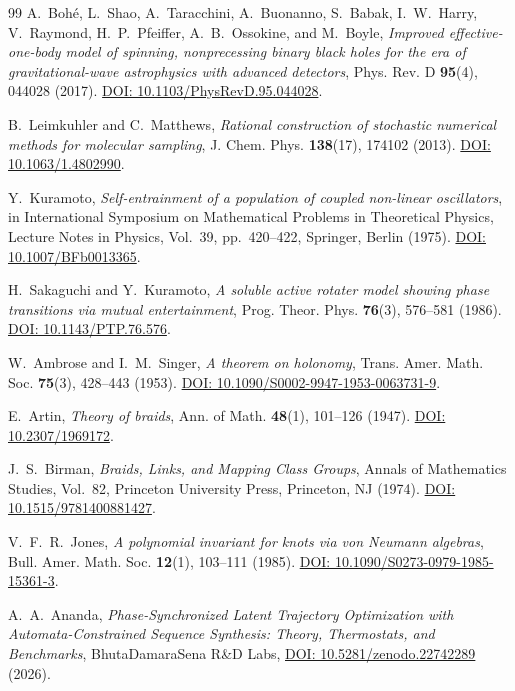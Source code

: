 \documentclass[11pt,a4paper,reqno]{article}
\theoremstyle{plain}
\theoremstyle{definition}
\theoremstyle{remark}
\numberwithin{equation}{section}
\begin{document}
\begin{thebibliography}{99}
A.~Boh{\'e}, L.~Shao, A.~Taracchini, A.~Buonanno, S.~Babak, I.~W.~Harry, V.~Raymond, H.~P.~Pfeiffer, A.~B.~Ossokine, and M.~Boyle, \textit{Improved effective-one-body model of spinning, nonprecessing binary black holes for the era of gravitational-wave astrophysics with advanced detectors}, Phys. Rev. D \textbf{95}(4), 044028 (2017). \href{https://doi.org/10.1103/PhysRevD.95.044028}{DOI: 10.1103/PhysRevD.95.044028}.

B.~Leimkuhler and C.~Matthews, \textit{Rational construction of stochastic numerical methods for molecular sampling}, J. Chem. Phys. \textbf{138}(17), 174102 (2013). \href{https://doi.org/10.1063/1.4802990}{DOI: 10.1063/1.4802990}.

Y.~Kuramoto, \textit{Self-entrainment of a population of coupled non-linear oscillators}, in International Symposium on Mathematical Problems in Theoretical Physics, Lecture Notes in Physics, Vol.~39, pp.~420--422, Springer, Berlin (1975). \href{https://doi.org/10.1007/BFb0013365}{DOI: 10.1007/BFb0013365}.

H.~Sakaguchi and Y.~Kuramoto, \textit{A soluble active rotater model showing phase transitions via mutual entertainment}, Prog. Theor. Phys. \textbf{76}(3), 576--581 (1986). \href{https://doi.org/10.1143/PTP.76.576}{DOI: 10.1143/PTP.76.576}.

W.~Ambrose and I.~M.~Singer, \textit{A theorem on holonomy}, Trans. Amer. Math. Soc. \textbf{75}(3), 428--443 (1953). \href{https://doi.org/10.1090/S0002-9947-1953-0063731-9}{DOI: 10.1090/S0002-9947-1953-0063731-9}.

E.~Artin, \textit{Theory of braids}, Ann. of Math. \textbf{48}(1), 101--126 (1947). \href{https://doi.org/10.2307/1969172}{DOI: 10.2307/1969172}.

J.~S.~Birman, \textit{Braids, Links, and Mapping Class Groups}, Annals of Mathematics Studies, Vol.~82, Princeton University Press, Princeton, NJ (1974). \href{https://doi.org/10.1515/9781400881427}{DOI: 10.1515/9781400881427}.

V.~F.~R.~Jones, \textit{A polynomial invariant for knots via von Neumann algebras}, Bull. Amer. Math. Soc. \textbf{12}(1), 103--111 (1985). \href{https://doi.org/10.1090/S0273-0979-1985-15361-3}{DOI: 10.1090/S0273-0979-1985-15361-3}.

A.~A.~Ananda, \textit{Phase-Synchronized Latent Trajectory Optimization with Automata-Constrained Sequence Synthesis: Theory, Thermostats, and Benchmarks}, BhutaDamaraSena R\&D Labs, \href{https://doi.org/10.5281/zenodo.22742289}{DOI: 10.5281/zenodo.22742289} (2026).


\end{thebibliography}
\end{document}
